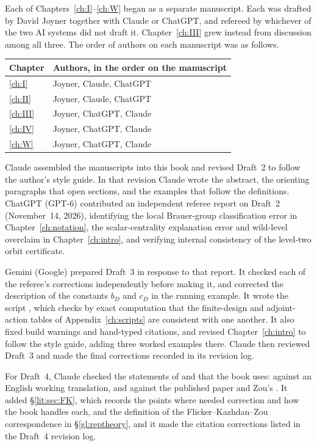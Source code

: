 \documentclass[12pt,letterpaper,oneside]{book}
\theoremstyle{plain}
\theoremstyle{definition}
\begin{document}
Each of Chapters~\ref{ch:I}--\ref{ch:W} began as a separate manuscript.
Each was drafted by David Joyner together with Claude or ChatGPT, and
refereed by whichever of the two AI systems did not draft it.
Chapter~\ref{ch:III} grew instead from discussion among all three. The
order of authors on each manuscript was as follows.
\begin{center}\small
\begin{tabular}{@{}ll@{}}\toprule
Chapter & Authors, in the order on the manuscript\\\midrule
\ref{ch:I} & Joyner, Claude, ChatGPT\\
\ref{ch:II} & Joyner, Claude, ChatGPT\\
\ref{ch:III} & Joyner, ChatGPT, Claude\\
\ref{ch:IV} & Joyner, ChatGPT, Claude\\
\ref{ch:W} & Joyner, ChatGPT, Claude\\
\bottomrule\end{tabular}
\end{center}
Claude assembled the manuscripts into this book and revised Draft~2 to
follow the author's style guide. In that revision Claude wrote the
abstract, the orienting paragraphs that open sections, and the examples
that follow the definitions. ChatGPT (GPT-6) contributed an independent
referee report on Draft~2 (November~14, 2026), identifying the local
Brauer-group classification error in Chapter~\ref{ch:notation}, the
scalar-centrality explanation error and wild-level overclaim in
Chapter~\ref{ch:intro}, and verifying internal consistency of the
level-two orbit certificate.

Gemini (Google) prepared Draft~3 in response to that report. It checked
each of the referee's corrections independently before making it, and
corrected the description of the constants $b_D$ and $c_D$ in the
running example. It wrote the script ,
which checks by exact computation that the finite-design and
adjoint-action tables of Appendix~\ref{ch:scripts} are consistent with
one another. It also fixed build warnings and hand-typed citations, and
revised Chapter~\ref{ch:intro} to follow the style guide, adding three
worked examples there. Claude then reviewed Draft~3 and made the final
corrections recorded in its revision log.

For Draft~4, Claude checked the statements of \cite{DKV84} and
\cite{FK86} that the book uses: \cite{DKV84} against an English
working translation, and \cite{FK86} against the published paper and
Zou's \cite{Zo23}. It added \S\ref{lit:sec:FK}, which records the
points where \cite{FK86} needed correction and how the book handles
each, and the definition of the Flicker--Kazhdan--Zou correspondence
in \S\ref{gl:reptheory}, and it made the citation corrections listed
in the Draft~4 revision log.
\end{document}
